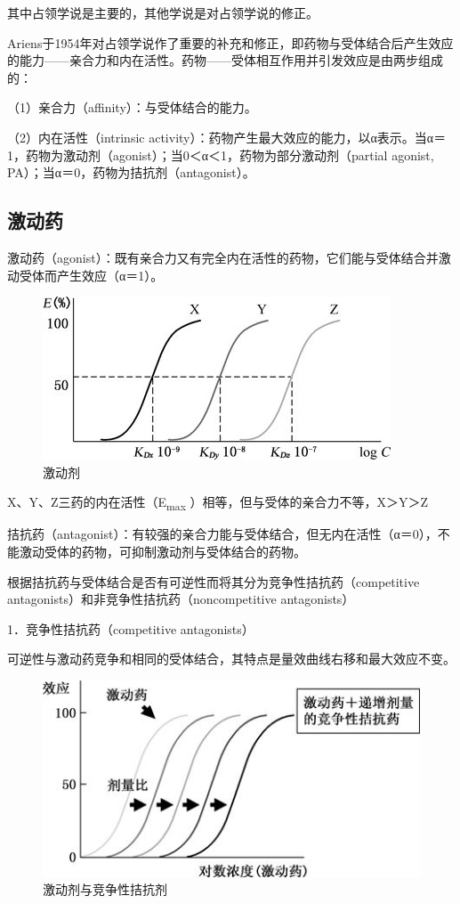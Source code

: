 其中占领学说是主要的，其他学说是对占领学说的修正。

Ariens于1954年对占领学说作了重要的补充和修正，即药物与受体结合后产生效应的能力------亲合力和内在活性。药物------受体相互作用并引发效应是由两步组成的：

（1）亲合力（affinity）：与受体结合的能力。

（2）内在活性（intrinsic
activity）：药物产生最大效应的能力，以α表示。当α＝1，药物为激动剂（agonist）；当0＜α＜1，药物为部分激动剂（partial
agonist, PA）；当α＝0，药物为拮抗剂（antagonist）。

\subsection{激动药}

激动药（agonist）：既有亲合力又有完全内在活性的药物，它们能与受体结合并激动受体而产生效应（α＝1）。

\begin{figure}[!htbp]
 \centering
 \includegraphics{./images/Image00008.jpg}
 \captionsetup{justification=centering}
 \caption{激动剂}
 \label{fig2-5}
  \end{figure} 

X、Y、Z三药的内在活性（E\textsubscript{max}
）相等，但与受体的亲合力不等，X＞Y＞Z

拮抗药（antagonist）：有较强的亲合力能与受体结合，但无内在活性（α＝0），不能激动受体的药物，可抑制激动剂与受体结合的药物。

根据拮抗药与受体结合是否有可逆性而将其分为竞争性拮抗药（competitive
antagonists）和非竞争性拮抗药（noncompetitive antagonists）

1．竞争性拮抗药（competitive antagonists）

可逆性与激动药竞争和相同的受体结合，其特点是量效曲线右移和最大效应不变。

\begin{figure}[!htbp]
 \centering
 \includegraphics{./images/Image00009.jpg}
 \captionsetup{justification=centering}
 \caption{激动剂与竞争性拮抗剂}
 \label{fig2-6}
  \end{figure} 


